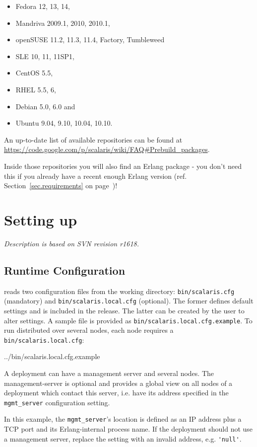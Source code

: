 \documentclass[a4paper]{scrreprt}
\newcommand{\codefile}[3][language=erlang]{
{

{#3}
}
}
\newcommand{\sieheref}[1]{\ref{#1} on page~\pageref{#1}}
\newcommand{\code}[1]{\lstinline[basicstyle=\ttfamily]!#1!}
\newcommand{\filetitle}[1]{\hbox to \linewidth{~~File \code{#1:}\hfill}}
\newcommand{\svnrev}[1]
{\hfill\emph{Description is based on SVN revision #1.}\medskip}
\begin{document}
\begin{itemize}
\item Fedora 12, 13, 14,
\item Mandriva 2009.1, 2010, 2010.1,
\item openSUSE 11.2, 11.3, 11.4, Factory, Tumbleweed
\item SLE 10, 11, 11SP1,
\item CentOS 5.5,
\item RHEL 5.5, 6,
\item Debian 5.0, 6.0 and
\item Ubuntu 9.04, 9.10, 10.04, 10.10.
\end{itemize}

An up-to-date list of available repositories can be found at
\url{https://code.google.com/p/scalaris/wiki/FAQ#Prebuild_packages}.

Inside those repositories you will also find an Erlang package - you don't
need this if you already have a recent enough Erlang version
(ref. Section~\sieheref{sec.requirements})!


\chapter{Setting up \scalaris{}}
\label{chapter.runscalaris}
\svnrev{r1618}

\section{Runtime Configuration}

\scalaris{} reads two configuration files from the working directory:
\code{bin/scalaris.cfg} (mandatory) and \code{bin/scalaris.local.cfg}
(optional). The former defines default settings and is included in the
release. The latter can be created by the user to alter settings.  A
sample file is provided as \code{bin/scalaris.local.cfg.example}. To run
\scalaris{} distributed over several nodes, each node requires a
\code{bin/scalaris.local.cfg}:

\codefile{scalaris.local.cfg}{../bin/scalaris.local.cfg.example}

A \scalaris{} deployment can have a management server and several nodes. The
management-server is optional and provides a global view on all nodes of a
\scalaris{} deployment which contact this server, i.e. have its address
specified in the \code{mgmt_server} configuration setting.

In this example, the \code{mgmt_server}'s location is defined as
an IP address plus a TCP port and its Erlang-internal process name.
If the deployment should not use a management server, replace the setting with
an invalid address, e.g. \code{'null'}.
\end{document}
